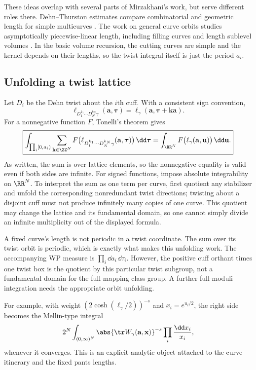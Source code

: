 These ideas overlap with several parts of Mirzakhani's work, but serve
different roles there. Dehn--Thurston estimates compare combinatorial and
geometric length for simple multicurves
\cite[Theorem 3.4 and equation (3.6)]{MirzSimple}. The work
on general curve orbits studies asymptotically piecewise-linear length,
including filling curves and length sublevel volumes
\cite[Theorem 4.1 and Section 8]{MirzGeneral}. In the basic volume recursion, the
cutting curves are simple and the kernel depends on their lengths, so the
twist integral itself is just the period $a_i$.

\subsection{Unfolding a twist lattice}

Let $D_i$ be the Dehn twist about the $i$th cuff. With a consistent sign
convention,
\[
 \ell_{D_1^{k_1}\cdots D_N^{k_N}\gamma}(\mathbf a,\boldsymbol\tau)
 =\ell_\gamma(\mathbf a,\boldsymbol\tau+\mathbf k\mathbf a).
\]
For a nonnegative function $F$, Tonelli's theorem gives
\begin{equation}
 \boxed{
 \int_{\prod_i[0,a_i)}\sum_{\mathbf k\in\ZZ^N}
 F\bigl(\ell_{D_1^{k_1}\cdots D_N^{k_N}\gamma}
                  (\mathbf a,\boldsymbol\tau)\bigr)\,\dd\boldsymbol\tau
 =\int_{\RR^N}F\bigl(\ell_\gamma(\mathbf a,\mathbf u)\bigr)\,\dd\mathbf u.}
 \label{eq:twistunfold}
\end{equation}
As written, the sum is over lattice elements, so the nonnegative equality
is valid even if both sides are infinite. For signed functions, impose
absolute integrability on $\RR^N$. To interpret the sum as one term per
curve, first quotient any stabilizer and unfold the corresponding
nonredundant twist directions; twisting about a disjoint cuff must not
produce infinitely many copies of one curve. This quotient may change
the lattice and its fundamental domain, so one cannot simply divide an
infinite multiplicity out of the displayed formula.

A fixed curve's length is not periodic in a twist coordinate. The sum over
its twist orbit is periodic, which is exactly what makes this unfolding
work. The accompanying WP measure is $\prod_i\dd a_i\,\dd\tau_i$.
However, the positive cuff orthant times one twist box is the quotient by
this particular twist subgroup, not a fundamental domain for the full
mapping class group. A further full-moduli integration needs the appropriate
orbit unfolding.

For example, with weight $(2\cosh(\ell_\gamma/2))^{-s}$ and
$x_i=e^{u_i/2}$, the right side becomes the Mellin-type integral
\begin{equation}
 2^N\int_{(0,\infty)^N}
 \abs{\tr W_\gamma(\mathbf a,\mathbf x)}^{-s}
             \prod_i\frac{\dd x_i}{x_i},
 \label{eq:mellin}
\end{equation}
whenever it converges. This is an explicit analytic object attached to the
curve itinerary and the fixed pants lengths.

